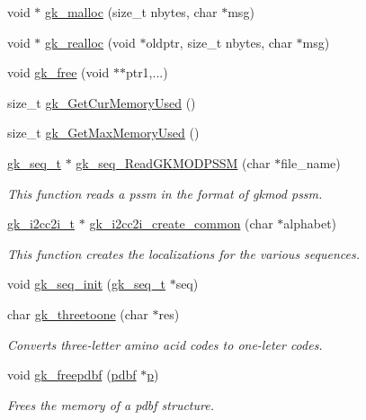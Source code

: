 \begin{DoxyCompactItemize}
\item 
void $\ast$ \hyperlink{a00077_aba6f76f5c67b9b7e9c2e45988d3d3e9d}{gk\+\_\+malloc} (size\+\_\+t nbytes, char $\ast$msg)
\item 
void $\ast$ \hyperlink{a00077_ab76a07ccd25288dd9acc99f5f24a7600}{gk\+\_\+realloc} (void $\ast$oldptr, size\+\_\+t nbytes, char $\ast$msg)
\item 
void \hyperlink{a00077_ac8df62c4e3d0910711a9874f9cc58884}{gk\+\_\+free} (void $\ast$$\ast$ptr1,...)
\item 
size\+\_\+t \hyperlink{a00077_ad2327b94227019b6753b6b09400c0522}{gk\+\_\+\+Get\+Cur\+Memory\+Used} ()
\item 
size\+\_\+t \hyperlink{a00077_a656fd5266ae12a96e53125486f8fea52}{gk\+\_\+\+Get\+Max\+Memory\+Used} ()
\item 
\hyperlink{a00674}{gk\+\_\+seq\+\_\+t} $\ast$ \hyperlink{a00077_a3cafd54880b0693e95789c512c6f22d3}{gk\+\_\+seq\+\_\+\+Read\+G\+K\+M\+O\+D\+P\+S\+SM} (char $\ast$file\+\_\+name)
\begin{DoxyCompactList}\small\item\em This function reads a pssm in the format of gkmod pssm. \end{DoxyCompactList}\item 
\hyperlink{a00670}{gk\+\_\+i2cc2i\+\_\+t} $\ast$ \hyperlink{a00077_a8b9f1e33d58df397a7f0f923a25ec256}{gk\+\_\+i2cc2i\+\_\+create\+\_\+common} (char $\ast$alphabet)
\begin{DoxyCompactList}\small\item\em This function creates the localizations for the various sequences. \end{DoxyCompactList}\item 
void \hyperlink{a00077_aab063d2d2e459531af4b4adfbf208054}{gk\+\_\+seq\+\_\+init} (\hyperlink{a00674}{gk\+\_\+seq\+\_\+t} $\ast$seq)
\item 
char \hyperlink{a00077_a6eb7d344c153ba6c0bbe608c18a4a2a1}{gk\+\_\+threetoone} (char $\ast$res)
\begin{DoxyCompactList}\small\item\em Converts three-\/letter amino acid codes to one-\/leter codes. \end{DoxyCompactList}\item 
void \hyperlink{a00077_ab49542f55191276b91d65ad61a198ab2}{gk\+\_\+freepdbf} (\hyperlink{a00666}{pdbf} $\ast$\hyperlink{a00614_a1e0420801cd5156c14e085b87a4945f5}{p})
\begin{DoxyCompactList}\small\item\em Frees the memory of a pdbf structure. \end{DoxyCompactList}\item 
$$
\end{DoxyCompactItemize}

